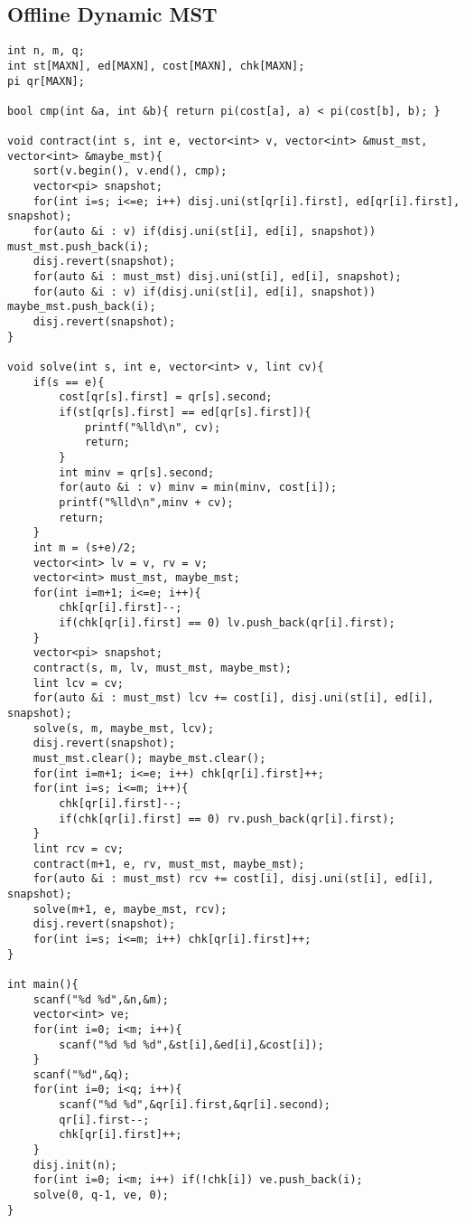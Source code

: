 \documentclass[landscape, 8pt, a4paper, oneside, twocolumn]{extarticle}
\begin{document}
\subsection{Offline Dynamic MST}
\begin{verbatim}
int n, m, q;
int st[MAXN], ed[MAXN], cost[MAXN], chk[MAXN];
pi qr[MAXN];

bool cmp(int &a, int &b){ return pi(cost[a], a) < pi(cost[b], b); }

void contract(int s, int e, vector<int> v, vector<int> &must_mst, vector<int> &maybe_mst){
	sort(v.begin(), v.end(), cmp);
	vector<pi> snapshot;
	for(int i=s; i<=e; i++) disj.uni(st[qr[i].first], ed[qr[i].first], snapshot);
	for(auto &i : v) if(disj.uni(st[i], ed[i], snapshot)) must_mst.push_back(i);
	disj.revert(snapshot);
	for(auto &i : must_mst) disj.uni(st[i], ed[i], snapshot);
	for(auto &i : v) if(disj.uni(st[i], ed[i], snapshot)) maybe_mst.push_back(i);
	disj.revert(snapshot);
}

void solve(int s, int e, vector<int> v, lint cv){
	if(s == e){
		cost[qr[s].first] = qr[s].second;
		if(st[qr[s].first] == ed[qr[s].first]){
			printf("%lld\n", cv);
			return;
		}
		int minv = qr[s].second;
		for(auto &i : v) minv = min(minv, cost[i]);
		printf("%lld\n",minv + cv);
		return;
	}
	int m = (s+e)/2;
	vector<int> lv = v, rv = v;
	vector<int> must_mst, maybe_mst;
	for(int i=m+1; i<=e; i++){
		chk[qr[i].first]--;
		if(chk[qr[i].first] == 0) lv.push_back(qr[i].first);
	}
	vector<pi> snapshot;
	contract(s, m, lv, must_mst, maybe_mst);
	lint lcv = cv;
	for(auto &i : must_mst) lcv += cost[i], disj.uni(st[i], ed[i], snapshot);
	solve(s, m, maybe_mst, lcv);
	disj.revert(snapshot);
	must_mst.clear(); maybe_mst.clear();
	for(int i=m+1; i<=e; i++) chk[qr[i].first]++;
	for(int i=s; i<=m; i++){
		chk[qr[i].first]--;
		if(chk[qr[i].first] == 0) rv.push_back(qr[i].first);
	}
	lint rcv = cv;
	contract(m+1, e, rv, must_mst, maybe_mst);
	for(auto &i : must_mst) rcv += cost[i], disj.uni(st[i], ed[i], snapshot);
	solve(m+1, e, maybe_mst, rcv);
	disj.revert(snapshot);
	for(int i=s; i<=m; i++) chk[qr[i].first]++;
}

int main(){
	scanf("%d %d",&n,&m);
	vector<int> ve;
	for(int i=0; i<m; i++){
		scanf("%d %d %d",&st[i],&ed[i],&cost[i]);
	}
	scanf("%d",&q);
	for(int i=0; i<q; i++){
		scanf("%d %d",&qr[i].first,&qr[i].second);
		qr[i].first--;
		chk[qr[i].first]++;
	}
	disj.init(n);
	for(int i=0; i<m; i++) if(!chk[i]) ve.push_back(i);
	solve(0, q-1, ve, 0);
}
\end{verbatim}
\end{document}
